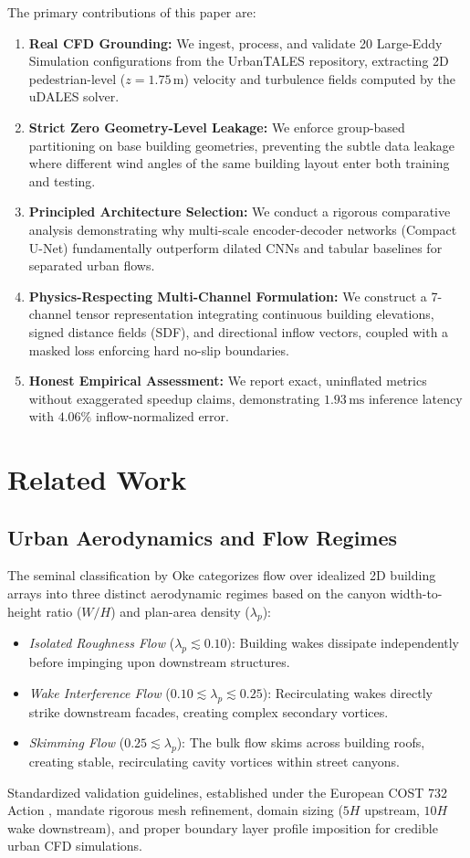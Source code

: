 \documentclass[10pt,twocolumn]{article}
\begin{document}
The primary contributions of this paper are:
\begin{enumerate}
    \item \textbf{Real CFD Grounding:} We ingest, process, and validate 20 Large-Eddy Simulation configurations from the UrbanTALES repository, extracting 2D pedestrian-level ($z=1.75\,\text{m}$) velocity and turbulence fields computed by the uDALES solver.
    \item \textbf{Strict Zero Geometry-Level Leakage:} We enforce group-based partitioning on base building geometries, preventing the subtle data leakage where different wind angles of the same building layout enter both training and testing.
    \item \textbf{Principled Architecture Selection:} We conduct a rigorous comparative analysis demonstrating why multi-scale encoder-decoder networks (Compact U-Net) fundamentally outperform dilated CNNs and tabular baselines for separated urban flows.
    \item \textbf{Physics-Respecting Multi-Channel Formulation:} We construct a 7-channel tensor representation integrating continuous building elevations, signed distance fields (SDF), and directional inflow vectors, coupled with a masked loss enforcing hard no-slip boundaries.
    \item \textbf{Honest Empirical Assessment:} We report exact, uninflated metrics without exaggerated speedup claims, demonstrating $1.93\,\text{ms}$ inference latency with $4.06\%$ inflow-normalized error.
\end{enumerate}

\section{Related Work}
\subsection{Urban Aerodynamics and Flow Regimes}
The seminal classification by Oke \cite{oke1988street} categorizes flow over idealized 2D building arrays into three distinct aerodynamic regimes based on the canyon width-to-height ratio ($W/H$) and plan-area density ($\lambda_p$):
\begin{itemize}
    \item \textit{Isolated Roughness Flow} ($\lambda_p \lesssim 0.10$): Building wakes dissipate independently before impinging upon downstream structures.
    \item \textit{Wake Interference Flow} ($0.10 \lesssim \lambda_p \lesssim 0.25$): Recirculating wakes directly strike downstream facades, creating complex secondary vortices.
    \item \textit{Skimming Flow} ($0.25 \lesssim \lambda_p$): The bulk flow skims across building roofs, creating stable, recirculating cavity vortices within street canyons.
\end{itemize}
Standardized validation guidelines, established under the European COST 732 Action \cite{franke2007best}, mandate rigorous mesh refinement, domain sizing ($5H$ upstream, $10H$ wake downstream), and proper boundary layer profile imposition for credible urban CFD simulations.
\end{document}
